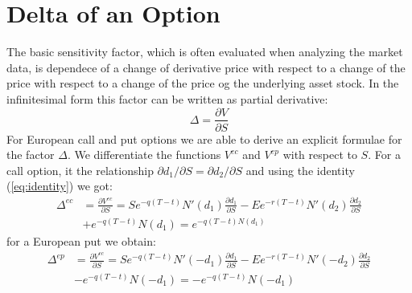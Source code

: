 \documentclass[a4paper]{article}
\begin{document}
\section{Delta of an Option}
The basic sensitivity factor, which is often evaluated when analyzing the market data, is dependece of a change of derivative price with respect to a change of the price
with respect to a change of the price og the underlying asset stock. In the infinitesimal form this factor can be written as partial
derivative:
\begin{equation}
    \Delta = \frac{\partial V}{\partial S}
\end{equation}
For European call and put options we are able to derive an explicit formulae for the factor $\Delta$. We differentiate the functions $V^{ec}$ and $V^{ep}$ with respect to $S$. For a call option, it 
the relationship $\partial d_1/ \partial S = \partial d_2 / \partial S$ and using the identity (\ref{eq:identity}) we got:
\begin{align}
\Delta^{ec} &= \frac{\partial V^{ec}}{\partial S} = Se^{-q(T-t)}N'(d_1) \frac{\partial d_1}{\partial S} - Ee^{-r(T-t)}N'(d_2)\frac{\partial d_2}{\partial S}\\
            &+ e^{-q(T-t)}N(d_1)= e^{-q(T-t)N(d_1)}
\end{align}
for a European put we obtain:
\begin{align}
    \Delta^{ep} &= \frac{\partial V^{ec}}{\partial S} = Se^{-q(T-t)}N'(-d_1)\frac{\partial d_1}{\partial S} - Ee^{-r(T-t)}N'(-d_2)\frac{\partial d_2}{\partial S}\\
    &- e^{-q(T-t)}N(-d_1)=-e^{-q(T-t)}N(-d_1)
\end{align} 
\end{document}
